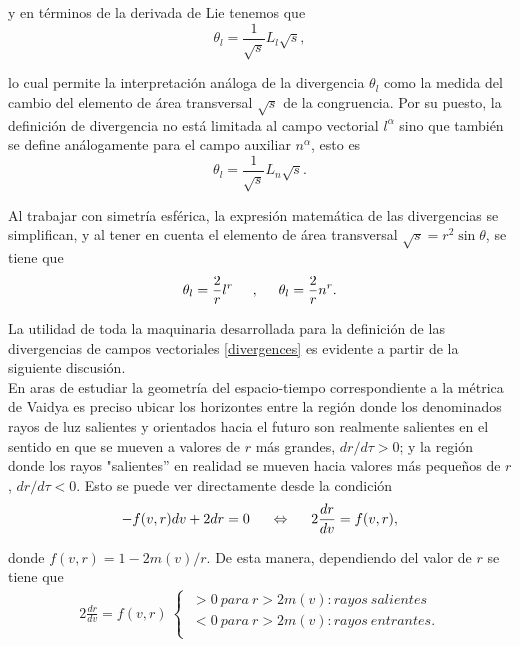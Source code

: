 \documentclass{article}
\numberwithin{equation}{section}
\theoremstyle{definition}
\begin{document}
y en términos de la derivada de Lie tenemos que
\begin{equation*}
\theta_l = \frac{1}{\sqrt{s}}L_l\sqrt{s},
\end{equation*}

lo cual permite la interpretación análoga de la divergencia $\theta_l$ como la medida del cambio del elemento de área transversal $\sqrt{s}$ de la congruencia. Por su puesto, la definición de divergencia no está limitada al campo vectorial $l^\alpha$ sino que también se define análogamente para el campo auxiliar $n^\alpha$, esto es
\begin{equation*}
\theta_l = \frac{1}{\sqrt{s}}L_n\sqrt{s}.
\end{equation*}

Al trabajar con simetría esférica, la expresión matemática de las divergencias se simplifican, y al tener en cuenta el elemento de área transversal $\sqrt{s} = r^2 \sin \theta$, se tiene que 
\begin{equation}
\label{divergences}
\theta_l = \frac{2}{r}l^r \hspace{.5cm},\hspace{.5cm} \theta_l = \frac{2}{r}n^r.
\end{equation}

\newpage
La utilidad de toda la maquinaria desarrollada para la definición de las divergencias de campos vectoriales \eqref{divergences} es evidente a partir de la siguiente discusión.\\

En aras de estudiar la geometría del espacio-tiempo correspondiente a la métrica de Vaidya es preciso ubicar los horizontes entre la región donde los denominados rayos de luz salientes y orientados hacia el futuro son realmente salientes en el sentido en que se mueven a valores de $r$ más grandes, $dr/d\tau >0$; y la región donde los rayos "salientes'' en realidad se mueven hacia valores más pequeños de $r$, $dr/d\tau <0$. Esto se puede ver directamente desde la condición
\begin{equation*}
-f(v,r)dv + 2dr = 0 \hspace{.5cm} \Leftrightarrow \hspace{.5cm} 2\frac{dr}{dv} = f(v,r),
\end{equation*}

donde $f(v,r) = 1 - 2m(v)/r$. De esta manera, dependiendo del valor de $r$ se tiene que
\begin{align*}
2\frac{dr}{dv} = f(v,r)\ 
\begin{cases}
\ > 0\ para\ r > 2m(v): rayos\  salientes\\  
\ < 0\ para\ r > 2m(v): rayos\  entrantes.\\
\end{cases}
\end{align*}
\end{document}
